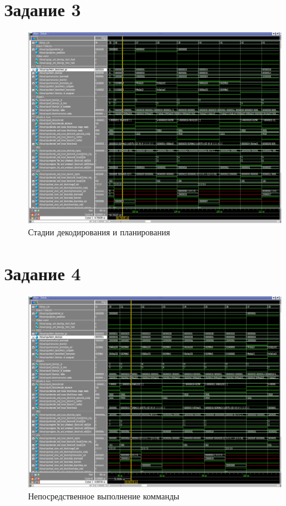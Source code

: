 \documentclass{article}
\begin{document}
\clearpage\section{Задание 3}
\begin{figure}[h]
	\centering
	\includegraphics[scale=0.4]{tools/task3.png}
	\caption{Стадии декодирования и планирования}
\end{figure}

\clearpage\section{Задание 4}
\begin{figure}[h]
	\centering
	\includegraphics[scale=0.4]{tools/task4.png}
	\caption{Непосредственное выполнение комманды}
\end{figure}
\end{document}
